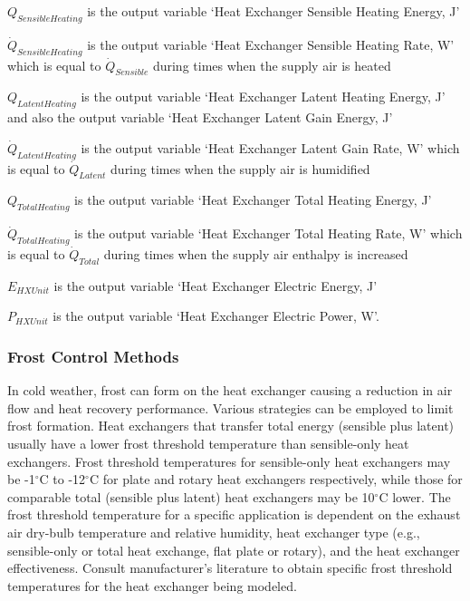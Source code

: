 \(Q_{SensibleHeating}\) is the output variable `Heat Exchanger Sensible Heating Energy, J'

\({\dot{Q}_{SensibleHeating}}\) is the output variable `Heat Exchanger Sensible Heating Rate, W' which is equal to \({\dot{Q}_{Sensible}}\) during times when the supply air is heated

\(Q_{LatentHeating}\) is the output variable `Heat Exchanger Latent Heating Energy, J' and also the output variable `Heat Exchanger Latent Gain Energy, J'

\({\dot{Q}_{LatentHeating}}\) is the output variable `Heat Exchanger Latent Gain Rate, W' which is equal to \({\dot{Q}_{Latent}}\) during times when the supply air is humidified

\(Q_{TotalHeating}\) is the output variable `Heat Exchanger Total Heating Energy, J'

\({\dot{Q}_{TotalHeating}}\) is the output variable `Heat Exchanger Total Heating Rate, W' which is equal to \({\dot{Q}_{Total}}\) during times when the supply air enthalpy is increased

\({E_{HXUnit}}\) is the output variable `Heat Exchanger Electric Energy, J'

\({P_{HXUnit}}\) is the output variable `Heat Exchanger Electric Power, W'.

\subsubsection{Frost Control Methods}\label{frost-control-methods}

In cold weather, frost can form on the heat exchanger causing a reduction in air flow and heat recovery performance. Various strategies can be employed to limit frost formation. Heat exchangers that transfer total energy (sensible plus latent) usually have a lower frost threshold temperature than sensible-only heat exchangers. Frost threshold temperatures for sensible-only heat exchangers may be -1\(^{\circ}\)C to -12\(^{\circ}\)C for plate and rotary heat exchangers respectively, while those for comparable total (sensible plus latent) heat exchangers may be 10\(^{\circ}\)C lower. The frost threshold temperature for a specific application is dependent on the exhaust air dry-bulb temperature and relative humidity, heat exchanger type (e.g., sensible-only or total heat exchange, flat plate or rotary), and the heat exchanger effectiveness. Consult manufacturer's literature to obtain specific frost threshold temperatures for the heat exchanger being modeled.

